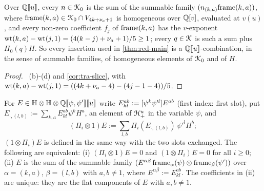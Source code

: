 \begin{lem}
\label{lem:tra-coeff}
Over $\mathbb{Q}[\![ u ]\!]$, every $n\in\mathcal{K}_{0}$ is the sum of the summable family $(n_{(k,a)}\mathrm{frame}(k,a))$, where $\mathrm{frame}(k,a)\in\mathcal{K}_{0}\cap V_{4k+\nu_a+1}$ is homogeneous over $\mathbb{Q}[v]$, evaluated at $v(u)$, and every non-zero coefficient $f_j$ of $\mathrm{frame}(k,a)$ has the $v$-exponent $\operatorname{wt}(k,a)-\operatorname{wt}(j,1) = (4(k-j)+\nu_a+1)/5\geq 1$; every $q\in\mathcal{K}$ is such a sum plus $\Pi_0(q)H$. So every insertion used in \cref{thm:red-main} is a $\mathbb{Q}[\![ u ]\!]$-combination, in the sense of summable families, of homogeneous elements of $\mathcal{K}_{0}$ and of $H$.
\end{lem}

\begin{proof}
~(b)-(d) and \cref{cor:tra-slice}, with $\operatorname{wt}(k,a)-\operatorname{wt}(j,1) = ((4k+\nu_a-4)-(4j-1-4))/5$.
\end{proof}

\begin{lem}
\label{lem:tra-twoslot}
For $E\in\mathbb{H}\otimes\mathbb{H}\otimes\mathbb{Q}[\![ \psi,\psi' ]\!][\![ u ]\!]$ write $E^{ab}_{kl} := [\psi^k\psi'^l]E^{ab}$ (first index: first slot), put $E_{\cdot,(l,b)} := \sum_{k,a}E^{ab}_{kl}\psi^kH^a$, an element of $\mathcal{H}^u_+$ in the variable $\psi$, and
\[
(\Pi_i\otimes 1)E := \sum_{l,b}\Pi_i(E_{\cdot,(l,b)})\,\psi'^lH^b ;
\]
$(1\otimes\Pi_i)E$ is defined in the same way with the two slots exchanged. The following are equivalent: (i) $(\Pi_i\otimes 1)E = 0$ and $(1\otimes\Pi_i)E = 0$ for all $i\geq 0$; (ii) $E$ is the sum of the summable family $(E^{\alpha\beta}\,\mathrm{frame}_\alpha(\psi)\otimes\mathrm{frame}_\beta(\psi'))$ over $\alpha = (k,a)$, $\beta = (l,b)$ with $a,b\neq 1$, where $E^{\alpha\beta} := E^{ab}_{kl}$. The coefficients in (ii) are unique: they are the flat components of $E$ with $a,b\neq 1$.
\end{lem}

